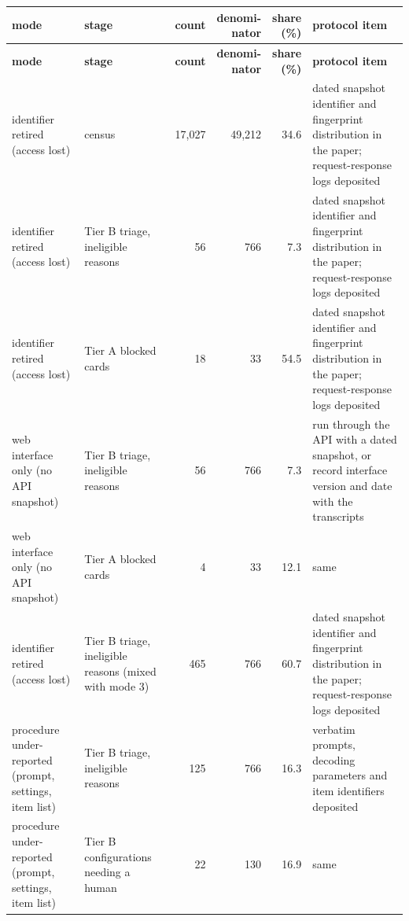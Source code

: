 \begingroup\scriptsize\setlength{\tabcolsep}{2.5pt}\renewcommand{\arraystretch}{1.08}
\begin{longtable}{>{\raggedright\arraybackslash}p{30mm}>{\raggedright\arraybackslash}p{24mm}rrr>{\raggedright\arraybackslash}p{34mm}}
\toprule
\textbf{mode} & \textbf{stage} & \textbf{count} & \shortstack[r]{\textbf{denomi-\allowbreak{}}\\\textbf{nator}} & \shortstack[r]{\textbf{share}\\\textbf{(\%)}} & \textbf{protocol item} \\
\midrule
\endfirsthead
\toprule
\textbf{mode} & \textbf{stage} & \textbf{count} & \shortstack[r]{\textbf{denomi-\allowbreak{}}\\\textbf{nator}} & \shortstack[r]{\textbf{share}\\\textbf{(\%)}} & \textbf{protocol item} \\
\midrule
\endhead
\bottomrule
\endfoot
1 identifier retired (access lost) & census & 17,027 & 49,212 & 34.6 & dated snapshot identifier and fingerprint distribution in the paper; request-\allowbreak{}response logs deposited \\
1 identifier retired (access lost) & Tier B triage, ineligible reasons & 56 & 766 & 7.3 & dated snapshot identifier and fingerprint distribution in the paper; request-\allowbreak{}response logs deposited \\
1 identifier retired (access lost) & Tier A blocked cards & 18 & 33 & 54.5 & dated snapshot identifier and fingerprint distribution in the paper; request-\allowbreak{}response logs deposited \\
2 web interface only (no API snapshot) & Tier B triage, ineligible reasons & 56 & 766 & 7.3 & run through the API with a dated snapshot, or record interface version and date with the transcripts \\
2 web interface only (no API snapshot) & Tier A blocked cards & 4 & 33 & 12.1 & same \\
1 identifier retired (access lost) & Tier B triage, ineligible reasons (mixed with mode 3) & 465 & 766 & 60.7 & dated snapshot identifier and fingerprint distribution in the paper; request-\allowbreak{}response logs deposited \\
3 procedure under-\allowbreak{}reported (prompt, settings, item list) & Tier B triage, ineligible reasons & 125 & 766 & 16.3 & verbatim prompts, decoding parameters and item identifiers deposited \\
3 procedure under-\allowbreak{}reported (prompt, settings, item list) & Tier B configurations needing a human & 22 & 130 & 16.9 & same \\

\end{longtable}
